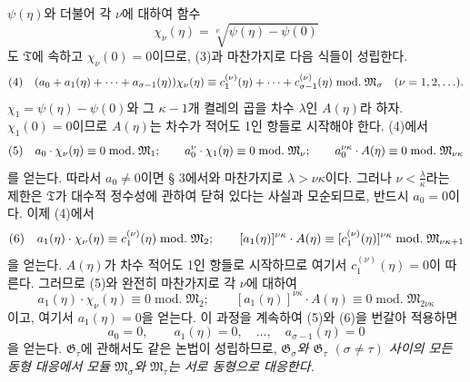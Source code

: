 $\psi(\eta)$와 더불어 각 $\nu$에 대하여 함수
\[
 \chi_\nu(\eta)=\sqrt[\nu]{\psi(\eta)-\psi(0)}
\]
도 $\mathfrak T$에 속하고 $\chi_\nu(0)=0$이므로, (3)과 마찬가지로 다음 식들이 성립한다.
\[
\begin{array}{@{}l@{\quad}l@{}}
(4)& \displaystyle (a_0+a_1(\eta)+\cdots+a_{\sigma-1}(\eta))\chi_\nu(\eta)
\equiv c_1^{(\nu)}(\eta)+\cdots+c_{\sigma-1}^{(\nu)}(\eta)
\;\mathrm{mod.}\;\mathfrak M_\sigma
\quad(\nu=1,2,\ldots).
\end{array}
\]
$\chi_1=\psi(\eta)-\psi(0)$와 그 $\kappa-1$개 켤레의 곱을 차수 $\lambda$인 $A(\eta)$라 하자. $\chi_1(0)=0$이므로 $A(\eta)$는 차수가 적어도 1인 항들로 시작해야 한다. (4)에서
\[
\begin{array}{@{}l@{\quad}l@{}}
(5)& \displaystyle a_0\cdot\chi_\nu(\eta)\equiv0\;\mathrm{mod.}\;\mathfrak M_1;\qquad
a_0^\nu\cdot\chi_1(\eta)\equiv0\;\mathrm{mod.}\;\mathfrak M_\nu;\qquad
a_0^{\nu\kappa}\cdot A(\eta)\equiv0\;\mathrm{mod.}\;\mathfrak M_{\nu\kappa}
\end{array}
\]
를 얻는다. 따라서 $a_0\ne0$이면 § 3에서와 마찬가지로 $\lambda>\nu\kappa$이다. 그러나 $\nu<\frac{\lambda}{\kappa}$라는 제한은 $\mathfrak T$가 대수적 정수성에 관하여 닫혀 있다는 사실과 모순되므로, 반드시 $a_0=0$이다. 이제 (4)에서
\[
\begin{array}{@{}l@{\quad}l@{}}
(6)& \displaystyle a_1(\eta)\cdot\chi_\nu(\eta)\equiv c_1^{(\nu)}(\eta)\;\mathrm{mod.}\;\mathfrak M_2;\qquad
[a_1(\eta)]^{\nu\kappa}\cdot A(\eta)
\equiv[c_1^{(\nu)}(\eta)]^{\nu\kappa}\;\mathrm{mod.}\;\mathfrak M_{\nu\kappa+1}
\end{array}
\]
을 얻는다. $A(\eta)$가 차수 적어도 1인 항들로 시작하므로 여기서 $c_1^{(\nu)}(\eta)=0$이 따른다. 그러므로 (5)와 완전히 마찬가지로 각 $\nu$에 대하여
\[
 a_1(\eta)\cdot\chi_\nu(\eta)\equiv0\;\mathrm{mod.}\;\mathfrak M_2;\qquad
 [a_1(\eta)]^{\nu\kappa}\cdot A(\eta)\equiv0\;\mathrm{mod.}\;\mathfrak M_{2\nu\kappa}
\]
이고, 여기서 $a_1(\eta)=0$을 얻는다. 이 과정을 계속하여 (5)와 (6)을 번갈아 적용하면
\[
 a_0=0,\qquad a_1(\eta)=0,\quad \ldots,\quad a_{\sigma-1}(\eta)=0
\]
을 얻는다. $\mathfrak G_\tau$에 관해서도 같은 논법이 성립하므로, \emph{$\mathfrak G_\sigma$와 $\mathfrak G_\tau$ $(\sigma\ne\tau)$ 사이의 모든 동형 대응에서 모듈 $\mathfrak M_\sigma$와 $\mathfrak M_\tau$는 서로 동형으로 대응한다.}

